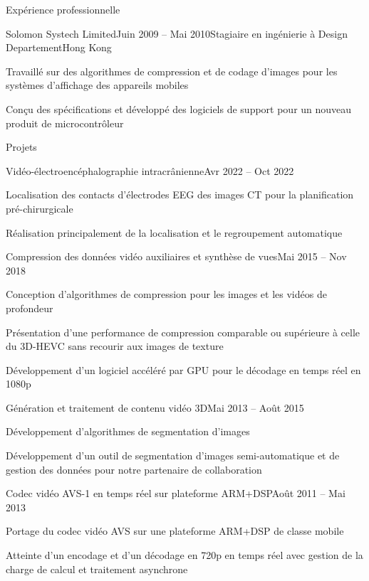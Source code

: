 \documentclass{resume} %
\begin{document}
\begin{rSection}{Expérience professionnelle}
	\begin{rSubsection}{Solomon Systech Limited}{Juin 2009 -- Mai 2010}{Stagiaire en ingénierie à Design Departement}{Hong Kong}
		\item Travaillé sur des algorithmes de compression et de codage d'images pour les systèmes d'affichage des appareils mobiles
		\item Conçu des spécifications et développé des logiciels de support pour un nouveau produit de microcontrôleur
	\end{rSubsection}
\end{rSection}


\begin{rSection}{Projets}

	\begin{rSubsection}{Vidéo-électroencéphalographie intracrânienne}{Avr 2022 -- Oct 2022}{}{}
		\item Localisation des contacts d'électrodes EEG des images CT pour la planification pré-chirurgicale
		\item Réalisation principalement de la localisation et le regroupement automatique
	\end{rSubsection}

	\begin{rSubsection}{Compression des données vidéo auxiliaires et synthèse de vues}{Mai 2015 -- Nov 2018}{}{}
		\item Conception d'algorithmes de compression pour les images et les vidéos de profondeur
		\item Présentation d'une performance de compression comparable ou supérieure à celle du 3D-HEVC sans recourir aux images de texture
		\item Développement d'un logiciel accéléré par GPU pour le décodage en temps réel en 1080p
	\end{rSubsection}
		
	\begin{rSubsection}{Génération et traitement de contenu vidéo 3D}{Mai 2013 -- Août 2015}{}{}
		\item Développement d'algorithmes de segmentation d'images
		\item Développement d'un outil de segmentation d'images semi-automatique et de gestion des données pour notre partenaire de collaboration
	\end{rSubsection}
		
	\begin{rSubsection}{Codec vidéo AVS-1 en temps réel sur plateforme ARM+DSP}{Août 2011 -- Mai 2013}{}{}
		\item Portage du codec vidéo AVS sur une plateforme ARM+DSP de classe mobile
		\item Atteinte d'un encodage et d'un décodage en 720p en temps réel avec gestion de la charge de calcul et traitement asynchrone
	\end{rSubsection}

\end{rSection}
\end{document}

